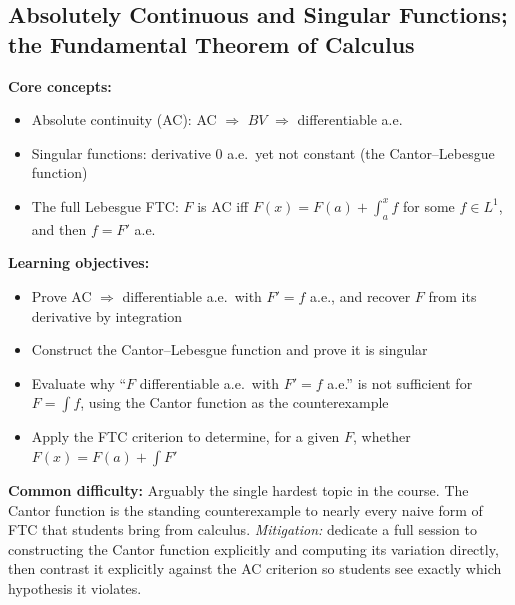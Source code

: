 \documentclass[11pt]{article}
\begin{document}
\subsection{Absolutely Continuous and Singular Functions; the Fundamental Theorem of Calculus}

\textbf{Core concepts:}
\begin{itemize}[nosep]
\item Absolute continuity (AC): AC $\Rightarrow$ $BV$ $\Rightarrow$ differentiable a.e.
\item Singular functions: derivative $0$ a.e.\ yet not constant (the Cantor--Lebesgue function)
\item The full Lebesgue FTC: $F$ is AC iff $F(x)=F(a)+\int_a^x f$ for some $f\in L^1$, and then $f=F'$ a.e.
\end{itemize}

\textbf{Learning objectives:}
\begin{itemize}[nosep]
\item Prove AC $\Rightarrow$ differentiable a.e.\ with $F'=f$ a.e., and recover $F$ from its derivative by integration
\item Construct the Cantor--Lebesgue function and prove it is singular
\item Evaluate why ``$F$ differentiable a.e.\ with $F'=f$ a.e.'' is not sufficient for $F=\int f$, using the Cantor function as the counterexample
\item Apply the FTC criterion to determine, for a given $F$, whether $F(x)=F(a)+\int F'$
\end{itemize}

\textbf{Common difficulty:} Arguably the single hardest topic in the course. The Cantor function is the standing counterexample to nearly every naive form of FTC that students bring from calculus. \textit{Mitigation:} dedicate a full session to constructing the Cantor function explicitly and computing its variation directly, then contrast it explicitly against the AC criterion so students see exactly which hypothesis it violates.
\end{document}
